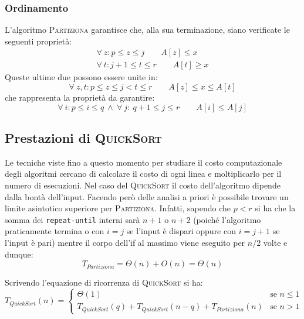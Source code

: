 \subsubsection{Ordinamento}
L'algoritmo \textsc{Partiziona} garantisce che, alla sua terminazione, siano verificate le seguenti proprietà:
\begin{eqnarray}
	\forall \ z: p \leq z \leq j \qquad A[z]\leq x\\
	\forall \ t: j+1 \leq t \leq r \qquad A[t]\geq x
\end{eqnarray}
Queste ultime due possono essere unite in:
\begin{equation}
	\forall \ z,t: p \leq z \leq j < t \leq r \qquad A[z]\leq x \leq A[t]
\end{equation}
che rappresenta la proprietà da garantire:
\begin{equation}
	\forall \ i: p \leq i \leq q \ \wedge \ \forall \ j: \ q+1 \leq j \leq r \qquad A[i]\leq A[j]
\end{equation}

\subsection{Prestazioni di \textsc{QuickSort}}
Le tecniche viste fino a questo momento per studiare il costo computazionale degli algoritmi cercano di calcolare il costo di ogni linea e moltiplicarlo per il numero di esecuzioni. Nel caso del \textsc{QuickSort} il costo dell'algoritmo dipende dalla bontà dell'input. Facendo però delle analisi a priori è possibile trovare un limite asintotico superiore per \textsc{Partiziona}. Infatti, sapendo che $p<r$ si ha che la somma dei \texttt{repeat-until} interni sarà $n + 1$ o $n + 2$ (poiché l’algoritmo praticamente termina o con $i = j$ se l’input è dispari oppure con $i = j + 1$ se l’input è pari) mentre il corpo dell’if al massimo viene eseguito per $n/2$ volte e dunque:
\begin{equation}
	T_{Partiziona}=\Theta(n)+O(n)=\Theta(n)
\end{equation}

Scrivendo l'equazione di ricorrenza di \textsc{QuickSort} si ha:
\begin{equation}\label{eqric:quicksort}
	T_{QuickSort}(n)=
	\left \{
	\begin{array}{lc}
		\Theta(1) & \mbox{se } n \leq 1 \\
		T_{QuickSort}(q)+ T_{QuickSort}(n-q) + T_{Partiziona}(n) & \mbox{se } n >1
	\end{array}
	\right.
\end{equation}

